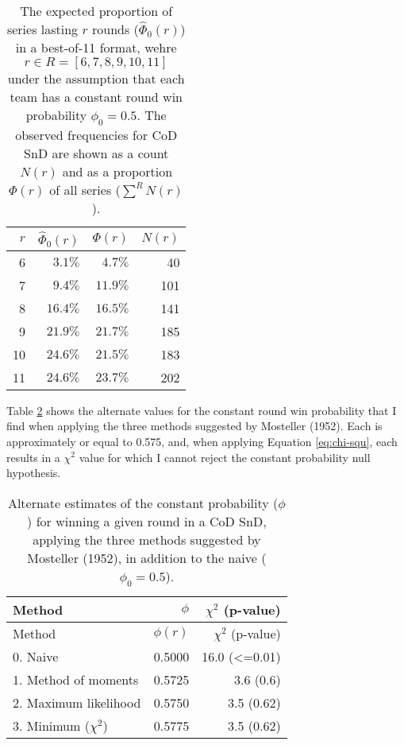 \documentclass{article}
\begin{document}
\begin{longtable}{rrrr}
\caption{The expected proportion of series lasting $r$ rounds ($\hat{\Phi}_0(r)$) in a best-of-11 format, wehre $r \in R = [6, 7, 8, 9, 10, 11]$ under the assumption that each team has a constant round win probability $\phi_0 = 0.5$. The observed frequencies for CoD SnD are shown as a count $N(r)$ and as a proportion $\Phi(r)$ of all series ($\sum^R N(r)$).}\label{tbl:cod-prob-series-lasting-r-rounds} \\
\toprule
$r$ & $\hat{\Phi}_0(r)$ & $\Phi(r)$ & $N(r)$ \\ 
\midrule
6 & $3.1\%$ & $4.7\%$ & 40 \\ 
7 & $9.4\%$ & $11.9\%$ & 101 \\ 
8 & $16.4\%$ & $16.5\%$ & 141 \\ 
9 & $21.9\%$ & $21.7\%$ & 185 \\ 
10 & $24.6\%$ & $21.5\%$ & 183 \\ 
11 & $24.6\%$ & $23.7\%$ & 202 \\ 
\bottomrule
\end{longtable}

Table \ref{tbl:mosteller-methods-results} shows the alternate values for
the constant round win probability that I find when applying the three
methods suggested by Mosteller (1952). Each is approximately or equal to
0.575, and, when applying Equation \ref{eq:chi-squ}, each results in a
\(\chi^2\) value for which I cannot reject the constant probability null
hypothesis.

\begin{longtable}[]{@{}lrr@{}}
\caption{Alternate estimates of the constant probability ($\phi$) for winning a given round in a CoD SnD, applying the three methods suggested by Mosteller (1952), in addition to the naive ($\phi_0 = 0.5$).}\label{tbl:mosteller-methods-results} \\
\toprule()
Method & $\phi$ & $\chi^2$ (p-value) \\
\midrule()
\endfirsthead
\toprule()
Method & $\phi(r)$ & $\chi^2$ (p-value) \\
\midrule()
\endhead
0. Naive & 0.5000 & 16.0 (\textless=0.01) \\
1. Method of moments & 0.5725 & 3.6 (0.6) \\
2. Maximum likelihood & 0.5750 & 3.5 (0.62) \\
3. Minimum ($\chi^2$) & 0.5775 & 3.5 (0.62) \\
\bottomrule()
\end{longtable}
\end{document}
